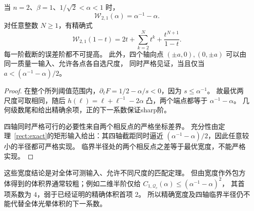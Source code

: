 \begin{corollary}[二维半阶的全体精确宽度及任意阶余项]\label{wid:half}
当 $n=2$、$\beta=1$、$1/\sqrt2<\alpha<1$ 时，
\[
 \mathcal W_{2,1}(\alpha)=\alpha^{-1}-\alpha.
\]
对任意整数 $N\ge1$，有精确式
\[
 \mathcal W_{2,1}(1-t)
 =2t+\sum_{k=2}^{N}t^k+\frac{t^{N+1}}{1-t}.
\]
每一阶截断的误差阶都不可提高。
此外，四个轴向点 $(\pm a,0),(0,\pm a)$ 可以由同一质量一输入、允许各点各自选尺度，
同时严格见证，当且仅当 $a<(\alpha^{-1}-\alpha)/2$。
\end{corollary}
\begin{proof}
在整个所列阈值范围内，$\partial_\ell F=1/2-\alpha/s<0$，因为 $s\le\alpha^{-1}$。
故最优两尺度可取相同，随后
$h(\ell)=\ell+\ell^{-1}-2\alpha$ 凸，两个端点都等于 $\alpha^{-1}-\alpha$。
几何级数尾和给出精确余项，正的下一系数保证sharp阶。

四轴同时严格可行的必要性来自两个相反点的严格坐标差界。
充分性由定理~\ref{rect:exact}的矩形输入给出：其四轴截距同时逼近
$(\alpha^{-1}-\alpha)/2$，因此任意较小的半径都可严格实现。
临界半径处的两个相反点之差等于最优宽度，不能严格实现。
\end{proof}

这些宽度结论是对全体可测输入、允许不同尺度的匹配定理。
但由宽度作外包方体得到的体积界通常较粗；例如二维半阶仅给
$C_{1,\mathcal Q_c}(\alpha)\le(\alpha^{-1}-\alpha)^2$，
其首项系数为 $4$，弱于已经证明的精确体积首项 $2$。
所以精确宽度及四轴临界半径仍不能代替全体光晕体积的下一系数。
